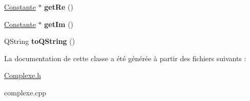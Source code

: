 \begin{DoxyCompactItemize}
\item 
\hypertarget{class_complexe_a5092fb9333bba54eadb4666c17ede45f}{\hyperlink{class_constante}{Constante} $\ast$ {\bfseries get\-Re} ()}\label{class_complexe_a5092fb9333bba54eadb4666c17ede45f}

\item 
\hypertarget{class_complexe_a06a17e03b95c2360cb38831e8766fe7d}{\hyperlink{class_constante}{Constante} $\ast$ {\bfseries get\-Im} ()}\label{class_complexe_a06a17e03b95c2360cb38831e8766fe7d}

\item 
\hypertarget{class_complexe_a965e1607226c63c751a33b8529bb294d}{Q\-String {\bfseries to\-Q\-String} ()}\label{class_complexe_a965e1607226c63c751a33b8529bb294d}

\end{DoxyCompactItemize}


La documentation de cette classe a été générée à partir des fichiers suivants \-:\begin{DoxyCompactItemize}
\item 
\hyperlink{_complexe_8h}{Complexe.\-h}\item 
complexe.\-cpp\end{DoxyCompactItemize}
